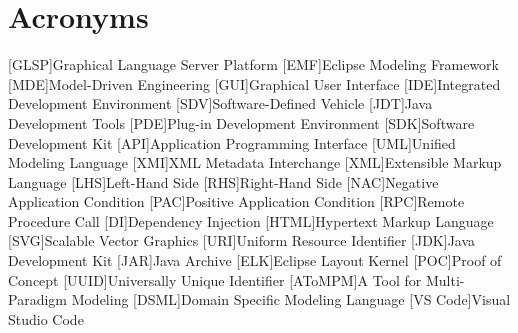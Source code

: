 \newpage
\section{Acronyms}
\label{sec:acronyms}
\begin{acronym}[AToMPM]
    [GLSP]{Graphical Language Server Platform}
    [EMF]{Eclipse Modeling Framework}
    [MDE]{Model-Driven Engineering}
    [GUI]{Graphical User Interface}
    [IDE]{Integrated Development Environment}
    [SDV]{Software-Defined Vehicle}
    [JDT]{Java Development Tools}
    [PDE]{Plug-in Development Environment}
    [SDK]{Software Development Kit}
    [API]{Application Programming Interface}
    [UML]{Unified Modeling Language}
    [XMI]{XML Metadata Interchange}
    [XML]{Extensible Markup Language}
    [LHS]{Left-Hand Side}
    [RHS]{Right-Hand Side}
    [NAC]{Negative Application Condition}
    [PAC]{Positive Application Condition}
    [RPC]{Remote Procedure Call}
    [DI]{Dependency Injection}
    [HTML]{Hypertext Markup Language}
    [SVG]{Scalable Vector Graphics}
    [URI]{Uniform Resource Identifier}
    [JDK]{Java Development Kit}
    [JAR]{Java Archive}
    [ELK]{Eclipse Layout Kernel}
    [POC]{Proof of Concept}
    [UUID]{Universally Unique Identifier}
    [AToMPM]{A Tool for Multi-Paradigm Modeling}
    [DSML]{Domain Specific Modeling Language}
    [VS Code]{Visual Studio Code}
  \end{acronym}